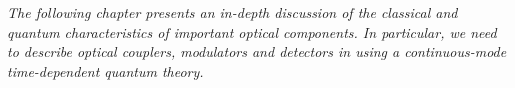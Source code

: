 \textit{The following chapter presents an in-depth discussion of the classical and quantum characteristics of important optical components. In particular, we need to describe optical couplers, modulators and detectors in using a continuous-mode time-dependent quantum theory.}
